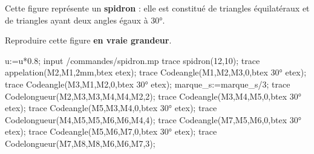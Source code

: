 \begin{exercice*}
    Cette figure représente un {\bfseries spidron} : elle est constitué de triangles équilatéraux et de triangles ayant deux angles égaux à \ang{30}.
    
    Reproduire cette figure {\bfseries en vraie grandeur}.

    \begin{Geometrie}[TypeTrace="MainLevee",CoinBG={(-u,-15u)},CoinHD={(15u,15u)}]
        u:=u*0.8;
        input \persopath/commandes/spidron.mp
        trace spidron(12,10);
        trace appelation(M2,M1,2mm,btex  etex);
        trace Codeangle(M1,M2,M3,0,btex \ang{30} etex);
        trace Codeangle(M3,M1,M2,0,btex \ang{30} etex);
        marque_s:=marque_s/3;
        trace Codelongueur(M2,M3,M3,M4,M4,M2,2);
        trace Codeangle(M3,M4,M5,0,btex \ang{30} etex);
        trace Codeangle(M5,M3,M4,0,btex \ang{30} etex);
        trace Codelongueur(M4,M5,M5,M6,M6,M4,4);
        trace Codeangle(M7,M5,M6,0,btex \ang{30} etex);
        trace Codeangle(M5,M6,M7,0,btex \ang{30} etex);
        trace Codelongueur(M7,M8,M8,M6,M6,M7,3);
    \end{Geometrie}
\end{exercice*}
